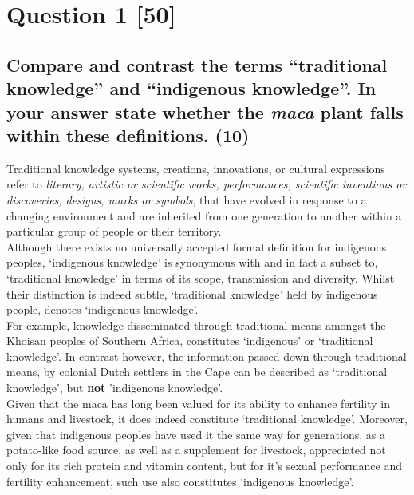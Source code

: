 \documentclass[11pt]{article}
\begin{document}
\section{Question 1 [50]}
\label{sec:org6377c34}

\cite{simelane09_african_trad_knowl_sys_biodiv_manag,saurombe09_protection_indigenous_trad_knowl_through_ip,masango14_trad_knowl_cultural_express_protect,masango10_indigenous_trad_knowl_protect_prospects,amechi15_trad_knowl_medical_uses_plants_pat_sa,amechi15_leverag_trad_knowl_medicinal,geyer10_towards_clearer_defin_underst_indi,rsa78_patents_act,wto17_trips}
\subsection{Compare and contrast the terms ``traditional knowledge'' and ``indigenous knowledge''. In your answer state whether the \emph{maca} plant falls within these definitions. (10)}
\label{sec:org83bb892}
Traditional knowledge systems, creations, innovations, or cultural expressions
refer to \emph{literary, artistic or scientific works, performances, scientific
inventions or discoveries, designs, marks or symbols}, that have evolved in
response to a changing environment and are inherited from one generation to
another within a particular group of people or their territory.\\

Although there exists no universally accepted formal definition for indigenous
peoples, `indigenous knowledge' is synonymous with and in fact a subset to,
`traditional knowledge' in terms of its scope, transmission and diversity.
Whilst their distinction is indeed subtle, `traditional knowledge' held by
indigenous people, denotes `indigenous knowledge'.\\

For example, knowledge disseminated through traditional means amongst the
Khoisan peoples of Southern Africa, constitutes `indigenous' or `traditional
knowledge'. In contrast however, the information passed down through traditional
means, by colonial Dutch settlers in the Cape can be described as `traditional
knowledge', but \textbf{not} 'indigenous knowledge'.\\

Given that the maca has long been valued for its ability to enhance fertility in
humans and livestock, it does indeed constitute `traditional knowledge'.
Moreover, given that indigenous peoples have used it the same way for
generations, as a potato-like food source, as well as a supplement for
livestock, appreciated not only for its rich protein and vitamin content, but
for it's sexual performance and fertility enhancement, such use also constitutes
`indigenous knowledge'.
\end{document}
